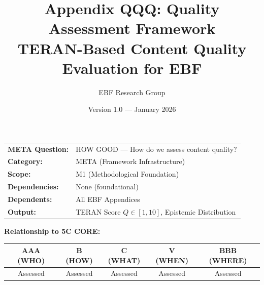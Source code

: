 \documentclass[11pt,a4paper]{article}
\title{\textbf{Appendix QQQ: Quality Assessment Framework}\\
\large TERAN-Based Content Quality Evaluation for EBF}
\author{EBF Research Group}
\date{Version 1.0 — January 2026}
\begin{document}
\maketitle


\begin{tcolorbox}[colback=blue!5,colframe=blue!75!black,title=\textbf{Header Block}]
\begin{tabular}{p{4cm}p{10cm}}
\textbf{META Question:} & HOW GOOD — How do we assess content quality? \\
\textbf{Category:} & META (Framework Infrastructure) \\
\textbf{Scope:} & M1 (Methodological Foundation) \\
\textbf{Dependencies:} & None (foundational) \\
\textbf{Dependents:} & All EBF Appendices \\
\textbf{Output:} & TERAN Score $Q \in [1, 10]$, Epistemic Distribution \\
\end{tabular}

\vspace{0.3cm}
\textbf{Relationship to 5C CORE:}
\begin{center}
\begin{tabular}{|c|c|c|c|c|}
\hline
\textbf{AAA (WHO)} & \textbf{B (HOW)} & \textbf{C (WHAT)} & \textbf{V (WHEN)} & \textbf{BBB (WHERE)} \\
\hline
Assessed & Assessed & Assessed & Assessed & Assessed \\
\hline
\end{tabular}
\end{center}
\end{tcolorbox}

\end{document}

